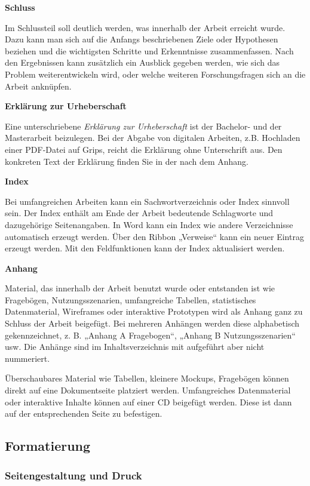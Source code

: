 \bigskip
\textbf{Schluss}

Im Schlussteil soll deutlich werden, was innerhalb der Arbeit erreicht wurde. Dazu kann man sich auf die Anfangs beschriebenen Ziele oder Hypothesen beziehen und die wichtigsten Schritte und Erkenntnisse zusammenfassen. Nach den Ergebnissen kann zusätzlich ein Ausblick gegeben werden, wie sich das Problem weiterentwickeln wird, oder welche weiteren Forschungsfragen sich an die Arbeit anknüpfen.

\bigskip
\textbf{Erklärung zur Urheberschaft}

Eine unterschriebene \textit{Erklärung zur Urheberschaft} ist der Bachelor- und der Masterarbeit beizulegen. Bei der Abgabe von digitalen Arbeiten, z.B. Hochladen einer PDF-Datei auf Grips, reicht die Erklärung ohne Unterschrift aus. Den konkreten Text der Erklärung finden Sie in der nach dem Anhang. 

\bigskip
\textbf{Index}

Bei umfangreichen Arbeiten kann ein Sachwortverzeichnis oder Index sinnvoll sein. Der Index enthält am Ende der Arbeit bedeutende Schlagworte und dazugehörige Seitenangaben. In Word kann ein Index wie andere Verzeichnisse automatisch erzeugt werden. Über den Ribbon „Verweise“ kann ein neuer Eintrag erzeugt werden. Mit den Feldfunktionen kann der Index aktualisiert werden.

\bigskip
\textbf{Anhang}

Material, das innerhalb der Arbeit benutzt wurde oder entstanden ist wie Fragebögen, Nutzungsszenarien, umfangreiche Tabellen, statistisches Datenmaterial, Wireframes oder interaktive Prototypen wird als Anhang ganz zu Schluss der Arbeit beigefügt. Bei mehreren Anhängen werden diese alphabetisch gekennzeichnet, z. B. „Anhang A Fragebogen“, „Anhang B Nutzungsszenarien“ usw. Die Anhänge sind im Inhaltsverzeichnis mit aufgeführt aber nicht nummeriert.

Überschaubares Material wie Tabellen, kleinere Mockups, Fragebögen können direkt auf eine Dokumentseite platziert werden. Umfangreiches Datenmaterial oder interaktive Inhalte können auf einer CD beigefügt werden. Diese ist dann auf der entsprechenden Seite zu befestigen. 

\subsection{Formatierung}\label{subsec:formatierung}

\subsubsection{Seitengestaltung und Druck}\label{subsubsec:seitengestaltung}

